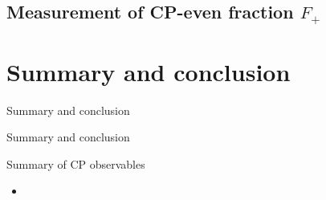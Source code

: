 \documentclass{beamer}
\begin{document}
\subsection{Measurement of CP-even fraction \texorpdfstring{$F_+$}{F+}}

\section{Summary and conclusion}
\begin{frame}{Summary and conclusion}
  \begin{center}
    {\huge Summary and conclusion}
  \end{center}
\end{frame}

\begin{frame}{Summary of CP observables}
  \begin{itemize}
    \item{}
  \end{itemize}
\end{frame}
\end{document}
